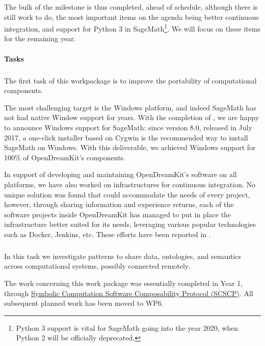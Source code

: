   The bulk of the milestone is thus completed, ahead of schedule,
  although there is still work to do, the most important items on the
  agenda being better continuous integration, and support for Python 3
  in SageMath\footnote{Python 3 support is vital for SageMath going
    into the year 2020, when Python 2 will be officially
    deprecated.}. We will focus on these items for the remaining year.
  
\paragraph{Tasks}

  \subparagraph{}
  \label{component-architecture@portability}
  The first task of this workpackage is to improve the portability of
  computational components.

  The most challenging target is the Windows platform, and indeed
  SageMath has not had native Window support for years. With the
  completion of
  , we are
  happy to announce Windows support for SageMath: since version 8.0,
  released in July 2017, a one-click installer based on Cygwin is the
  recommended way to install SageMath on Windows. With this
  deliverable, we achieved Windows support for 100\% of OpenDreamKit's
  components.

  In support of developing and maintaining OpenDreamKit's software on
  all platforms, we have also worked on infrastructures for continuous
  integration. No unique solution was found that could accommodate the
  needs of every project, however, through sharing information and
  experience returns, each of the software projects inside
  OpenDreamKit has managed to put in place the infrastructure better
  suited for its needs, leveraging various popular technologies such
  as Docker, Jenkins, etc. These efforts have been reported in
  .

  \subparagraph{}
  \label{component-architecture@interface-systems}
  In this task we investigate patterns to share data, ontologies,
  and semantics across computational systems, possibly connected
  remotely.

  The work concerning this work package was essentially completed in
  Year 1, through
  \href{http://www.symbolic-computing.org/science/index.php/SCSCP}{Symbolic
    Computation Software Composability Protocol (SCSCP)}. All
  subsequent planned work has been moved to WP6.


